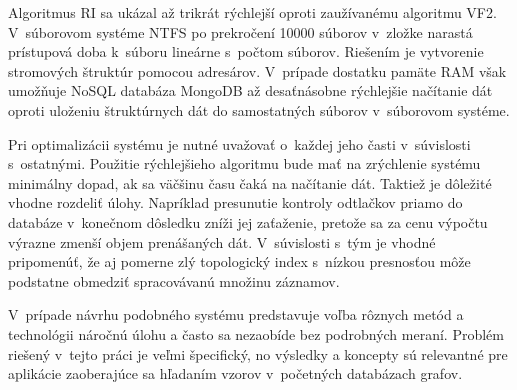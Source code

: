\documentclass[slovak]{ExcelAtFIT} %
\begin{document}
Algoritmus RI sa ukázal až trikrát rýchlejší oproti zaužívanému algoritmu VF2. V~súborovom systéme NTFS po prekročení 10000 súborov v~zložke narastá prístupová doba k~súboru lineárne s~počtom súborov. Riešením je vytvorenie stromových štruktúr pomocou adresárov. V~prípade dostatku pamäte RAM však umožňuje NoSQL databáza MongoDB až de\-sať\-ná\-sob\-ne rýchlejšie načítanie dát oproti uloženiu štruktúrnych dát do samostatných súborov v~súborovom systéme. 

Pri optimalizácii systému je nutné uvažovať o~kaž\-dej jeho časti v~súvislosti s~ostatnými. Použitie rý\-chlej\-šie\-ho algoritmu bude mať na zrýchlenie systému minimálny dopad, ak sa väčšinu času čaká na načítanie dát. Taktiež je dôležité vhodne rozdeliť úlohy. Na\-prí\-klad presunutie kontroly odtlačkov priamo do databáze v~konečnom dôsledku zníži jej zaťaženie, pretože sa za cenu výpočtu výrazne zmenší objem prenášaných dát. V~súvislosti s~tým je vhodné pripomenúť, že aj pomerne zlý topologický index s~nízkou presnosťou môže podstatne obmedziť spracovávanú množinu záznamov.

V~prípade návrhu podobného systému predstavuje voľba rôznych metód a technológii náročnú úlohu a často sa nezaobíde bez podrobných meraní. Problém riešený v~tejto práci je veľmi špecifický, no výsledky a koncepty sú relevantné pre aplikácie zaoberajúce sa hľadaním vzorov v~početných databázach grafov. 
\end{document}
